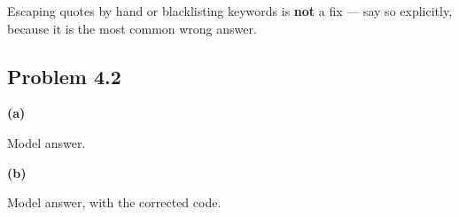 \begin{caution}
Escaping quotes by hand or blacklisting keywords is \textbf{not} a fix ---
say so explicitly, because it is the most common wrong answer.
\end{caution}

\vspace{4mm}

\subsection*{Problem 4.2}

\textbf{(a)}
\begin{ans}
Model answer.
\end{ans}

\textbf{(b)}
\begin{ans}
Model answer, with the corrected code.
\end{ans}
